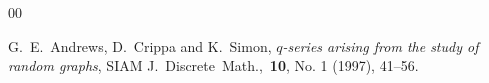 \documentclass[11pt,reqno]{amsart}
\renewcommand{\(}{\left\(}
\renewcommand{\)}{\right\)}
\renewcommand{\[}{\left\[}
\renewcommand{\]}{\right\]}
\numberwithin{equation}{section}
\theoremstyle{plain}
\begin{document}
\begin{thebibliography}{00}
 
  
  
 
%  
 
G.~E.~Andrews, D.~Crippa and K.~Simon, \emph{$q$-series arising from the study of random graphs}, SIAM J.~Discrete~Math.,~\textbf{10}, No. 1 (1997), 41--56.
 
 
 
 
 
 

\end{thebibliography}
\end{document}
